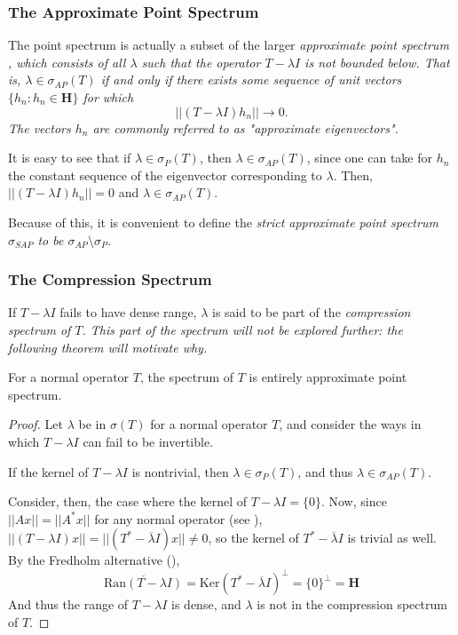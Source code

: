 \subsubsection{The Approximate Point Spectrum}
The point spectrum is actually a subset of the larger \em approximate point
spectrum \em, which consists of all $\lambda$ such that the operator $T-\lambda
I$ is not bounded below. That is, $\lambda \in \sigma_{AP}(T)$ if and only if
there exists some sequence of unit vectors $\{h_n: h_n \in \textbf{H}\}$ for
which
\[
    ||(T-\lambda I)h_n|| \to 0.
\]
The vectors $h_n$ are commonly referred to as "approximate eigenvectors".

It is easy to see that if $\lambda\in\sigma_P(T)$, then
$\lambda\in\sigma_{AP}(T)$, since one can take for $h_n$ the constant sequence
of the eigenvector corresponding to $\lambda$. Then, $||(T-\lambda I)h_n|| = 0$
and $\lambda\in\sigma_{AP}(T)$.

Because of this, it is convenient to define the \em strict approximate point
spectrum \em $\sigma_{SAP}$ to be $\sigma_{AP}\setminus\sigma_P$.

\subsubsection{The Compression Spectrum}
If $T-\lambda I$ fails to have dense range, $\lambda$ is said to be part of the
\em compression spectrum \em of $T$. This part of the spectrum will not be
explored further: the following theorem will motivate why.
\begin{theorem}
    For a normal operator $T$, the spectrum of $T$ is entirely approximate point
    spectrum.
\end{theorem}
\begin{proof}
    Let $\lambda$ be in $\sigma(T)$ for a normal operator $T$, and consider the
    ways in which $T-\lambda I$ can fail to be invertible.

    If the kernel of $T-\lambda I$ is nontrivial, then $\lambda\in\sigma_{P}(T)$,
    and thus $\lambda\in\sigma_{AP}(T)$.

    Consider, then, the case where the kernel of $T-\lambda I = \{0\}$. Now,
    since $||Ax|| = ||A^*x||$ for any normal operator (see \cite[prop.
    2.14]{MacCluer2009}),
    $||(T-\lambda I)x|| = ||(T^* - \overline{\lambda}I)x|| \not= 0$, so the
    kernel of $T^* - \overline{\lambda}I$ is trivial as well.
    By the Fredholm alternative (\cite[p. 350]{Olver2014}),
    \[
        \overline{\text{Ran}(T-\lambda I)} = \text{Ker}(T^* -
        \overline{\lambda}I)^{\perp} = \{0\}^{\perp} = \textbf{H}
        \]
    And thus the range of $T-\lambda I$ is dense, and $\lambda$ is not in the
    compression spectrum of $T$.
\end{proof}

